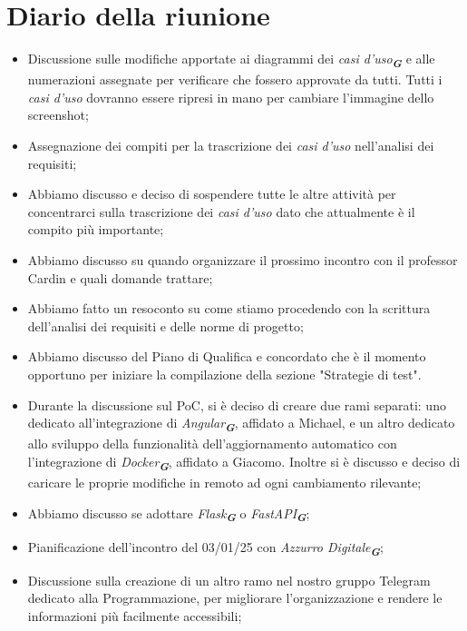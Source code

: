 
\section{Diario della riunione}

\begin{itemize}
    \item Discussione sulle modifiche apportate ai diagrammi dei \emph{casi d'uso}\textsubscript{\textit{\textbf{G}}} e alle numerazioni assegnate per verificare che fossero approvate da tutti. Tutti i \emph{casi d'uso} dovranno essere ripresi in mano per cambiare l'immagine dello screenshot;
    \item Assegnazione dei compiti per la trascrizione dei \emph{casi d'uso} nell'analisi dei requisiti;
    \item Abbiamo discusso e deciso di sospendere tutte le altre attività per concentrarci sulla trascrizione dei \emph{casi d'uso} dato che attualmente è il compito più importante;
    \item Abbiamo discusso su quando organizzare il prossimo incontro con il professor Cardin e quali domande trattare;
    \item Abbiamo fatto un resoconto su come stiamo procedendo con la scrittura dell'analisi dei requisiti e delle norme di progetto;
    \item Abbiamo discusso del Piano di Qualifica e concordato che è il momento opportuno per iniziare la compilazione della sezione "Strategie di test".
    \item Durante la discussione sul PoC, si è deciso di creare due rami separati: uno dedicato all'integrazione di \emph{Angular}\textsubscript{\textit{\textbf{G}}}, affidato a Michael, e un altro dedicato allo sviluppo della funzionalità dell'aggiornamento automatico con l'integrazione di \emph{Docker}\textsubscript{\textit{\textbf{G}}}, affidato a Giacomo. Inoltre si è discusso e deciso di caricare le proprie modifiche in remoto ad ogni cambiamento rilevante;
    \item Abbiamo discusso se adottare \emph{Flask}\textsubscript{\textit{\textbf{G}}} o \emph{FastAPI}\textsubscript{\textit{\textbf{G}}}; 
    \item Pianificazione dell'incontro del 03/01/25 con \emph{Azzurro Digitale}\textsubscript{\textit{\textbf{G}}};
    \item Discussione sulla creazione di un altro ramo nel nostro gruppo Telegram dedicato alla Programmazione, per migliorare l'organizzazione e rendere le informazioni più facilmente accessibili;
 \end{itemize}
